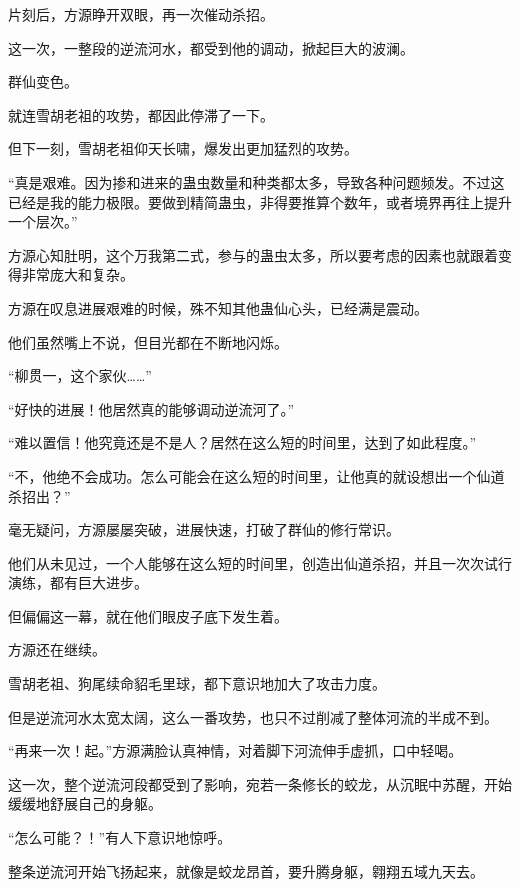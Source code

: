 
\begin{this_body}



片刻后，方源睁开双眼，再一次催动杀招。

这一次，一整段的逆流河水，都受到他的调动，掀起巨大的波澜。

群仙变色。

就连雪胡老祖的攻势，都因此停滞了一下。

但下一刻，雪胡老祖仰天长啸，爆发出更加猛烈的攻势。

“真是艰难。因为掺和进来的蛊虫数量和种类都太多，导致各种问题频发。不过这已经是我的能力极限。要做到精简蛊虫，非得要推算个数年，或者境界再往上提升一个层次。”

方源心知肚明，这个万我第二式，参与的蛊虫太多，所以要考虑的因素也就跟着变得非常庞大和复杂。

方源在叹息进展艰难的时候，殊不知其他蛊仙心头，已经满是震动。

他们虽然嘴上不说，但目光都在不断地闪烁。

“柳贯一，这个家伙……”

“好快的进展！他居然真的能够调动逆流河了。”

“难以置信！他究竟还是不是人？居然在这么短的时间里，达到了如此程度。”

“不，他绝不会成功。怎么可能会在这么短的时间里，让他真的就设想出一个仙道杀招出？”

毫无疑问，方源屡屡突破，进展快速，打破了群仙的修行常识。

他们从未见过，一个人能够在这么短的时间里，创造出仙道杀招，并且一次次试行演练，都有巨大进步。

但偏偏这一幕，就在他们眼皮子底下发生着。

方源还在继续。

雪胡老祖、狗尾续命貂毛里球，都下意识地加大了攻击力度。

但是逆流河水太宽太阔，这么一番攻势，也只不过削减了整体河流的半成不到。

“再来一次！起。”方源满脸认真神情，对着脚下河流伸手虚抓，口中轻喝。

这一次，整个逆流河段都受到了影响，宛若一条修长的蛟龙，从沉眠中苏醒，开始缓缓地舒展自己的身躯。

“怎么可能？！”有人下意识地惊呼。

整条逆流河开始飞扬起来，就像是蛟龙昂首，要升腾身躯，翱翔五域九天去。


\end{this_body}
